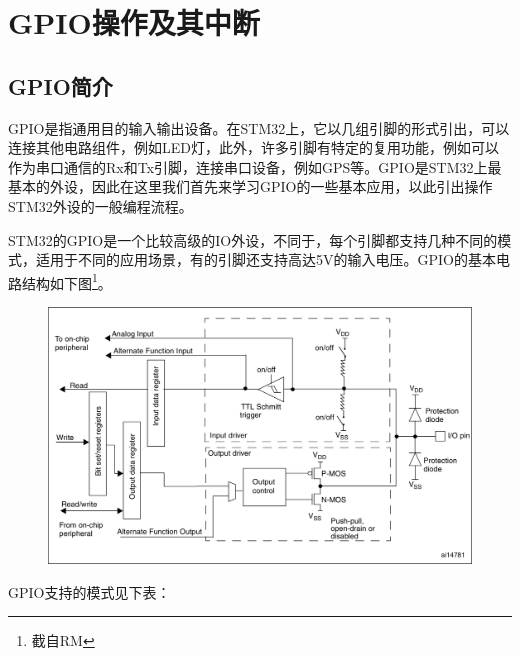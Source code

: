 \renewenvironment{longtable}{\rowcolors{2}{LightGray}{white}\oldlongtable} {\endoldlongtable}
\chapter{GPIO操作及其中断}
\section{GPIO简介}
\ac{GPIO}是指通用目的输入输出设备。在STM32上，它以几组引脚的形式引出，可以连接其他电路组件，例如LED灯，此外，许多引脚有特定的复用功能，例如可以作为串口通信的Rx和Tx引脚，连接串口设备，例如GPS等。GPIO是STM32上最基本的外设，因此在这里我们首先来学习GPIO的一些基本应用，以此引出操作STM32外设的一般编程流程。
\par 
STM32的GPIO是一个比较高级的IO外设，不同于，每个引脚都支持几种不同的模式，适用于不同的应用场景，有的引脚还支持高达5V的输入电压。GPIO的基本电路结构如下图\footnote{截自\acs{RM}}。
\par 
\begin{figure}[h]
	\includegraphics[width=\textwidth]{images/content/gpioCircuit.png}
	\label{fig:gpioCircuit}
\end{figure}
\par 
\newpage
GPIO支持的模式见下表：
